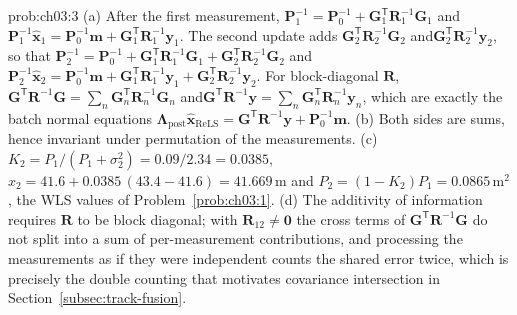 \begin{sol}{prob:ch03:3}
(a) After the first measurement, $\mathbf{P}_1^{-1}=\mathbf{P}_0^{-1}+\mathbf{G}_1^{\mathsf T}\mathbf{R}_1^{-1}\mathbf{G}_1$ and\allowbreak $\mathbf{P}_1^{-1}\widehat{\mathbf{x}}_1=\mathbf{P}_0^{-1}\mathbf{m}+\mathbf{G}_1^{\mathsf T}\mathbf{R}_1^{-1}\mathbf{y}_1$. The second update adds $\mathbf{G}_2^{\mathsf T}\mathbf{R}_2^{-1}\mathbf{G}_2$ and\allowbreak $\mathbf{G}_2^{\mathsf T}\mathbf{R}_2^{-1}\mathbf{y}_2$, so that
$\mathbf{P}_2^{-1}=\mathbf{P}_0^{-1}+\mathbf{G}_1^{\mathsf T}\mathbf{R}_1^{-1}\mathbf{G}_1+\mathbf{G}_2^{\mathsf T}\mathbf{R}_2^{-1}\mathbf{G}_2$ and
$\mathbf{P}_2^{-1}\widehat{\mathbf{x}}_2=\mathbf{P}_0^{-1}\mathbf{m}+\mathbf{G}_1^{\mathsf T}\mathbf{R}_1^{-1}\mathbf{y}_1+\mathbf{G}_2^{\mathsf T}\mathbf{R}_2^{-1}\mathbf{y}_2$.
For block-diagonal $\mathbf{R}$, $\mathbf{G}^{\mathsf T}\mathbf{R}^{-1}\mathbf{G}=\sum_n\mathbf{G}_n^{\mathsf T}\mathbf{R}_n^{-1}\mathbf{G}_n$ and\allowbreak $\mathbf{G}^{\mathsf T}\mathbf{R}^{-1}\mathbf{y}=\sum_n\mathbf{G}_n^{\mathsf T}\mathbf{R}_n^{-1}\mathbf{y}_n$, which are exactly the batch normal equations $\mathbf{\Lambda}_{\mathrm{post}}\widehat{\mathbf{x}}_{\mathrm{ReLS}}=\mathbf{G}^{\mathsf T}\mathbf{R}^{-1}\mathbf{y}+\mathbf{P}_0^{-1}\mathbf{m}$.
(b) Both sides are sums, hence invariant under permutation of the measurements.
(c) $K_2=P_1/(P_1+\sigma_2^{2})=0.09/2.34=0.0385$, $\widehat{x}_2=41.6+0.0385\,(43.4-41.6)=41.669$\,m and $P_2=(1-K_2)P_1=0.0865$\,m$^{2}$, the WLS values of Problem~\ref{prob:ch03:1}.
(d) The additivity of information requires $\mathbf{R}$ to be block diagonal; with $\mathbf{R}_{12}\neq\mathbf{0}$ the cross terms of $\mathbf{G}^{\mathsf T}\mathbf{R}^{-1}\mathbf{G}$ do not split into a sum of per-measurement contributions, and processing the measurements as if they were independent counts the shared error twice, which is precisely the double counting that motivates covariance intersection in Section~\ref{subsec:track-fusion}.
\end{sol}

